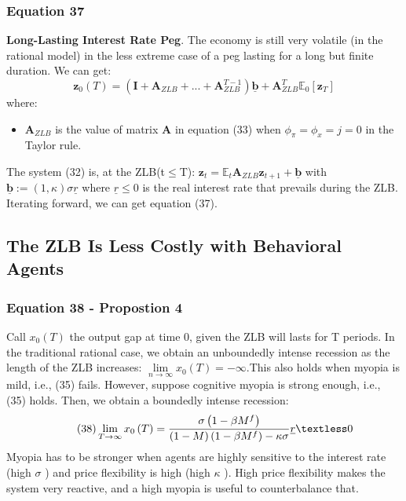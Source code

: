\documentclass{article}
\begin{document}
\subsubsection*{Equation 37}
\textbf{Long-Lasting Interest Rate Peg}. The economy is still very volatile (in the rational model) in the less extreme case of a peg lasting for a long but finite duration. We can get:
\begin{equation} \tag{37}
    \textbf{z}_{0}(T)=\left(\textbf{I}+\textbf{A}_{ZLB}+...+\textbf{A}_{ZLB}^{T-1}\right)\underline{\textbf{b}}+\textbf{A}_{ZLB}^{T}\mathbb{E}_{0}\left[\textbf{z}_{T}\right]
\end{equation}
where:
\begin{itemize}
    \item $\textbf{A}_{ZLB}$ is the value of matrix $\textbf{A}$ in equation (33) when $\phi_{\pi}=\phi_{x}=j=0$ in the Taylor rule.
\end{itemize}
The system (32) is, at the ZLB(t$\leq$T): $\textbf{z}_{t}=\mathbb{E}_{t}\textbf{A}_{ZLB}\textbf{z}_{t+1}+\underline{\textbf{b}}$ with $\underline{\textbf{b}}:=\left(1,\kappa\right)\sigma\underline{r}$ where $\underline{r}\leq 0$ is the real interest rate that prevails during the ZLB. Iterating forward, we can get equation (37).

\subsection{The ZLB Is Less Costly with Behavioral Agents}

\subsubsection*{Equation 38 - Propostion 4}
Call $x_{0}\left(T\right)$ the output gap at time 0, given the ZLB will lasts for T periods. In the traditional rational case, we obtain an unboundedly intense recession as the length of the ZLB increases: $\lim\limits_{n\to\infty}x_{0}\left(T\right)=-\infty$.This also holds when myopia is mild, i.e., (35) fails. However, suppose cognitive myopia is strong enough, i.e., (35) holds. Then, we obtain a boundedly intense recession:
\begin{equation}\tag{38}
    \lim\limits_{T\to\infty}x_{0}\left(T\right)=\frac{\sigma\left(1-\beta M^{f}\right)}{\left(1-M\right)\left(1-\beta M^{f}\right)-\kappa\sigma}\underline{r}\textless 0
\end{equation}
Myopia has to be stronger when agents are highly sensitive to the interest rate (high $\sigma$ ) and price flexibility is high (high $\kappa$ ). High price flexibility makes the system very reactive, and a high myopia is useful to counterbalance that.
\end{document}
